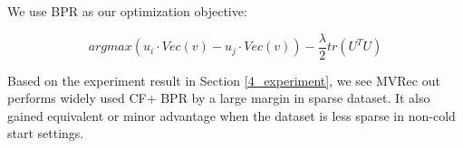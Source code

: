 We use BPR as our optimization objective:

\begin{equation}\label{skipgram}
    arg max (u_i \cdot Vec(v)-u_j \cdot Vec(v)) - \dfrac{\lambda}{2}tr(U^TU)
\end{equation}


Based on the experiment result in Section \ref{4_experiment}, we see MVRec out performs widely used CF+ BPR by a large margin in sparse dataset. It also gained equivalent or minor advantage when the dataset is less sparse in non-cold start settings.



